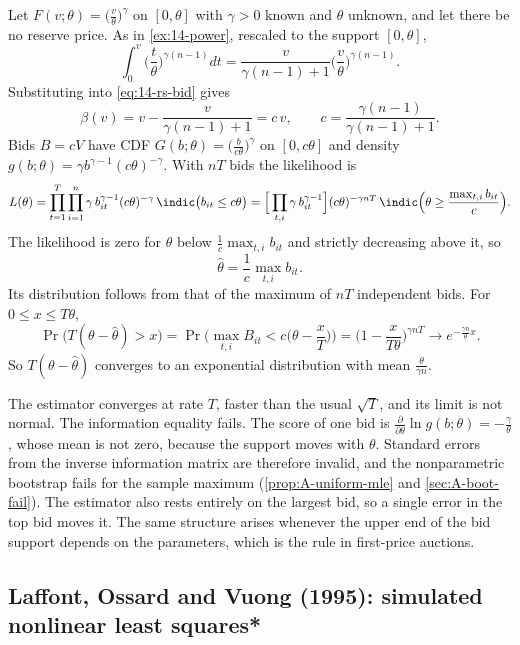 \begin{example}\label{ex:15-power-mle}
Let $F(v;\theta)=\big(\frac{v}{\theta}\big)^\gamma$ on $[0,\theta]$ with $\gamma>0$ known and $\theta$ unknown, and let
there be no reserve price. As in \cref{ex:14-power}, rescaled to the support $[0,\theta]$,
\[
\int_0^v\Big(\frac{t}{\theta}\Big)^{\gamma(n-1)}dt=\frac{v}{\gamma(n-1)+1}\Big(\frac{v}{\theta}\Big)^{\gamma(n-1)}.
\]
Substituting into \eqref{eq:14-rs-bid} gives
\[
\beta(v)=v-\frac{v}{\gamma(n-1)+1}=c\,v,\qquad c=\frac{\gamma(n-1)}{\gamma(n-1)+1}.
\]
Bids $B=cV$ have CDF $G(b;\theta)=\big(\frac{b}{c\theta}\big)^\gamma$ on $[0,c\theta]$ and density
$g(b;\theta)=\gamma b^{\gamma-1}(c\theta)^{-\gamma}$. With $nT$ bids the likelihood is
\[
L(\theta)=\prod_{t=1}^T\prod_{i=1}^n\gamma\,b_{it}^{\gamma-1}(c\theta)^{-\gamma}\,\indic\big(b_{it}\le c\theta\big)
=\Big[\prod_{t,i}\gamma\,b_{it}^{\gamma-1}\Big](c\theta)^{-\gamma nT}\,\indic\Big(\theta\ge\frac{\max_{t,i}b_{it}}{c}\Big).
\]
The likelihood is zero for $\theta$ below $\frac{1}{c}\max_{t,i}b_{it}$ and strictly decreasing above it, so
\[
\hat\theta=\frac{1}{c}\max_{t,i}b_{it}.
\]
Its distribution follows from that of the maximum of $nT$ independent bids. For $0\le x\le T\theta$,
\[
\Pr\big(T(\theta-\hat\theta)>x\big)=\Pr\Big(\max_{t,i}B_{it}<c\Big(\theta-\frac{x}{T}\Big)\Big)
=\Big(1-\frac{x}{T\theta}\Big)^{\gamma nT}\longrightarrow e^{-\frac{\gamma n}{\theta}x}.
\]
So $T(\theta-\hat\theta)$ converges to an exponential distribution with mean $\frac{\theta}{\gamma n}$.
\end{example}

The estimator converges at rate $T$, faster than the usual $\sqrt T$, and its limit is not normal. The information
equality fails. The score of one bid is $\frac{\partial}{\partial\theta}\ln g(b;\theta)=-\frac{\gamma}{\theta}$, whose mean is not
zero, because the support moves with $\theta$. Standard errors from the inverse information matrix are therefore
invalid, and the nonparametric bootstrap fails for the sample maximum (\cref{prop:A-uniform-mle} and
\cref{sec:A-boot-fail}). The estimator also rests entirely on the largest bid, so a single error in the top bid moves
it. The same structure arises whenever the upper end of the bid support depends on the parameters, which is the rule
in first-price auctions.

\subsection{Laffont, Ossard and Vuong (1995): simulated nonlinear least squares*}\label{sec:15-lov}

